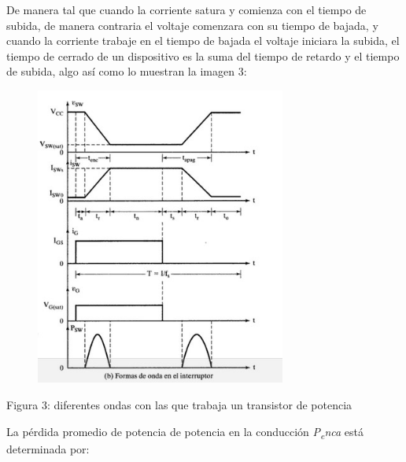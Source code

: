 \documentclass[12pt]{article}
\begin{document}
\setlength{\parskip}{0.0pt}
De manera tal que cuando la corriente satura y comienza con el tiempo de subida, de manera contraria el voltaje comenzara con su tiempo de bajada, y cuando la corriente trabaje en el tiempo de bajada el voltaje iniciara la subida, el tiempo de cerrado de un dispositivo es la suma del tiempo de retardo y el tiempo de subida, algo así como lo muestran la imagen 3:\par




\begin{figure}[H]
	\begin{Center}
		\includegraphics[width=3.24in,height=3.87in]{./media/image4.jpg}
	\end{Center}
\end{figure}



\setlength{\parskip}{15.96pt}
\par

\setlength{\parskip}{24.84pt}
Figura 3: diferentes ondas con las que trabaja un transistor de potencia\par

\setlength{\parskip}{7.92pt}
\begin{adjustwidth}{0.25in}{0.0in}
La pérdida promedio de potencia de potencia en la conducción \textit{P\textsubscript{e}nca }está determinada por:\par

\end{adjustwidth}
\end{document}
